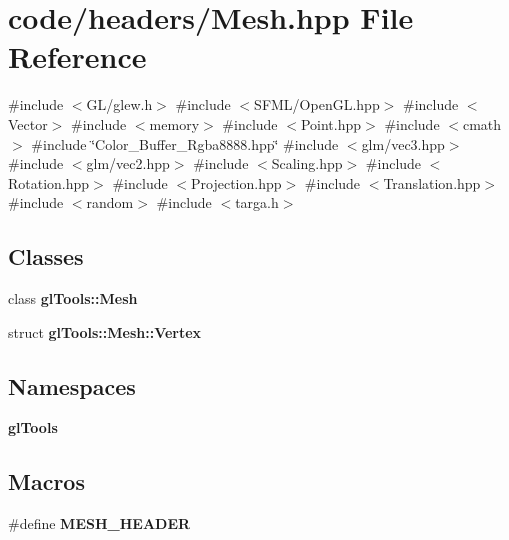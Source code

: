 \section{code/headers/\+Mesh.hpp File Reference}
\label{_mesh_8hpp}
{\ttfamily \#include $<$G\+L/glew.\+h$>$}\newline
{\ttfamily \#include $<$S\+F\+M\+L/\+Open\+G\+L.\+hpp$>$}\newline
{\ttfamily \#include $<$Vector$>$}\newline
{\ttfamily \#include $<$memory$>$}\newline
{\ttfamily \#include $<$Point.\+hpp$>$}\newline
{\ttfamily \#include $<$cmath$>$}\newline
{\ttfamily \#include \char`\"{}Color\+\_\+\+Buffer\+\_\+\+Rgba8888.\+hpp\char`\"{}}\newline
{\ttfamily \#include $<$glm/vec3.\+hpp$>$}\newline
{\ttfamily \#include $<$glm/vec2.\+hpp$>$}\newline
{\ttfamily \#include $<$Scaling.\+hpp$>$}\newline
{\ttfamily \#include $<$Rotation.\+hpp$>$}\newline
{\ttfamily \#include $<$Projection.\+hpp$>$}\newline
{\ttfamily \#include $<$Translation.\+hpp$>$}\newline
{\ttfamily \#include $<$random$>$}\newline
{\ttfamily \#include $<$targa.\+h$>$}\newline
\subsection*{Classes}
\begin{DoxyCompactItemize}
\item 
class \textbf{ gl\+Tools\+::\+Mesh}
\item 
struct \textbf{ gl\+Tools\+::\+Mesh\+::\+Vertex}
\end{DoxyCompactItemize}
\subsection*{Namespaces}
\begin{DoxyCompactItemize}
\item 
 \textbf{ gl\+Tools}
\end{DoxyCompactItemize}
\subsection*{Macros}
\begin{DoxyCompactItemize}
\item 
\#define \textbf{ M\+E\+S\+H\+\_\+\+H\+E\+A\+D\+ER}
\end{DoxyCompactItemize}


